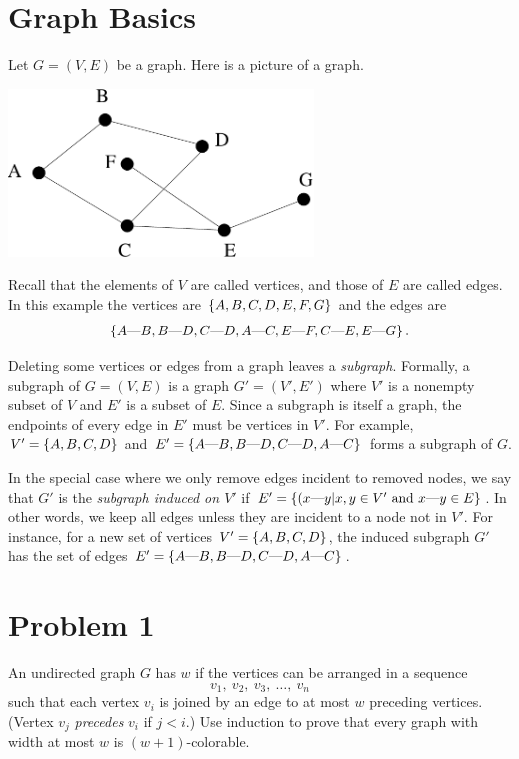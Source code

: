 \documentclass[12pt]{article}
\newcommand{\edge}[2]{#1\text{---}#2}
\begin{document}

\section{Graph Basics}

Let $G = (V,E)$ be a graph. Here is a picture of a graph.
\begin{center}
\includegraphics[height=1.75in]{example}
\end{center}
Recall that the elements of $V$ are called vertices, and those of $E$
are called edges. In this example the vertices are $\left\{A, B, C, D,
  E, F,G\right\}$ and the edges are $$\set{\edge{A}{B}, \edge{B}{D},
  \edge{C}{D}, \edge{A}{C}, \edge{E}{F}, \edge{C}{E}, \edge{E}{G}}.$$

Deleting some vertices or edges from a graph leaves a {\em subgraph}.
Formally, a subgraph of $G = (V, E)$ is a graph $G' = (V', E')$ where
$V'$ is a nonempty subset of $V$ and $E'$ is a subset of $E$.  Since a
subgraph is itself a graph, the endpoints of every edge in $E'$ must
be vertices in $V'$. For example, $V' = \left\{A,B,C,D\right\}$ and $E' =
\set{\edge{A}{B},\edge{B}{D},\edge{C}{D}, \edge{A}{C}}$ forms a
subgraph of $G$.

In the special case where we only remove edges incident to removed
nodes, we say that $G'$ is the {\em subgraph induced on $V'$} if $E' =
\{( \edge{x}{y}| x,y \in V' {\rm ~and~} \edge{x}{y} \in E \}$.  In
other words, we keep all edges unless they are incident to a node not
in $V'$. For instance, for a new set of vertices $V'=\left\{A,B,C,D\right\}$,
the induced subgraph $G'$ has the set of edges $E'=
\set{\edge{A}{B},\edge{B}{D},\edge{C}{D}, \edge{A}{C}}$.

\section{Problem 1}
An undirected graph $G$ has  $w$ if the vertices can be
arranged in a sequence
%
\[
v_1,\ v_2,\ v_3,\ \ldots,\ v_n
\]
%
such that each vertex $v_i$ is joined by an edge to at most $w$
preceding vertices.  (Vertex $v_j$ \textit{precedes} $v_i$ if $j <
i$.)  Use induction to prove that every graph with width at most $w$
is $(w + 1)$-colorable.
\end{document}
